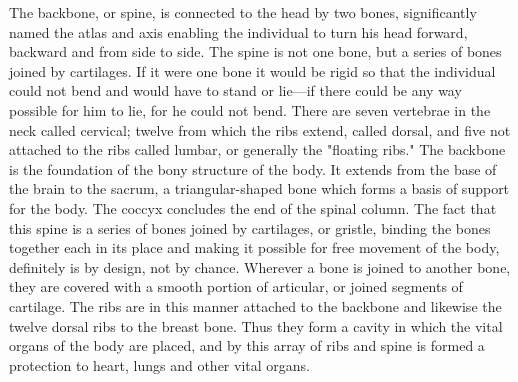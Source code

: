 The backbone, or spine, is connected to the head by two bones, significantly named the atlas
and axis enabling the individual to turn his head forward, backward and from side to side.
The spine is not one bone, but a series of bones joined by cartilages. If it were one bone it
would be rigid so that the individual could not bend and would have to stand or lie—if there
could be any way possible for him to lie, for he could not bend. There are seven vertebrae in
the neck called cervical; twelve from which the ribs extend, called dorsal, and five not
attached to the ribs called lumbar, or generally the "floating ribs." The backbone is the
foundation of the bony structure of the body. It extends from the base of the brain to the
sacrum, a triangular-shaped bone which forms a basis of support for the body. The coccyx
concludes the end of the spinal column. The fact that this spine is a series of bones joined by
cartilages, or gristle, binding the bones together each in its place and making it possible for
free movement of the body, definitely is by design, not by chance. Wherever a bone is joined
to another bone, they are covered with a smooth portion of articular, or joined segments of
cartilage. The ribs are in this manner attached to the backbone and likewise the twelve dorsal
ribs to the breast bone. Thus they form a cavity in which the vital organs of the body are
placed, and by this array of ribs and spine is formed a protection to heart, lungs and other
vital organs.

